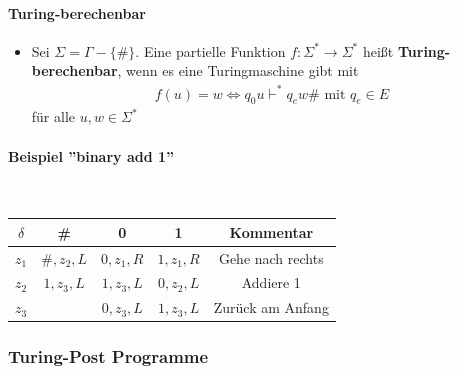 \documentclass{scrartcl}
\begin{document}
\paragraph{Turing-berechenbar}

\begin{itemize}
	\item Sei $\Sigma = \Gamma - \{ \# \}$. Eine partielle Funktion $f: \Sigma^* \rightarrow \Sigma^*$ heißt \textbf{Turing-berechenbar}, wenn es eine Turingmaschine gibt mit
	\begin{align*}
		f(u) = w \iff q_0 u \vdash^* q_e w \# \text{ mit } q_e \in E
	\end{align*}
	für alle $u,w \in \Sigma^*$
\end{itemize}

\paragraph{Beispiel ''binary add 1''}\mbox{}\\

\renewcommand{\arraystretch}{1.2}
\begin{tabular}{|c|c|c|c|c|}
	\hline 
	$\delta$ & \# & 0 & 1 & Kommentar \\ 
	\hline 
	$z_1$ & $\#,z_2,L$ & $0,z_1,R$ & $1,z_1,R$ & Gehe nach rechts \\ 
	\hline 
	$z_2$ & $1,z_3,L$ & $1,z_3,L$ & $0,z_2,L$ & Addiere 1 \\ 
	\hline 
	$z_3$ & & $0,z_3,L$ & $1,z_3,L$ & Zurück am Anfang \\ 
	\hline 
\end{tabular} 

\subsubsection{Turing-Post Programme}
\end{document}
